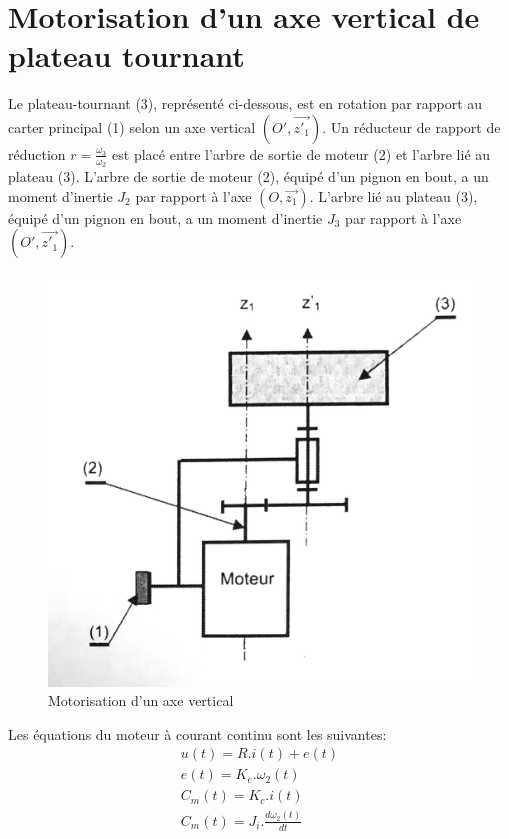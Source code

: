 

\section{Motorisation d'un axe vertical de plateau tournant}

Le plateau-tournant (3), représenté ci-dessous, est en rotation par rapport au carter principal (1) selon un axe vertical $(O',\overrightarrow{z'_1})$. Un réducteur de rapport de réduction $r=\frac{\omega_3}{\omega_2}$ est placé entre l'arbre de sortie de moteur (2) et l'arbre lié au plateau (3). L'arbre de sortie de moteur (2), équipé d'un pignon en bout, a un moment d'inertie $J_2$ par rapport à l'axe $(O,\overrightarrow{z_1})$. L'arbre lié au plateau (3), équipé d'un pignon en bout, a un moment d'inertie $J_3$ par rapport à l'axe $(O',\overrightarrow{z'_1})$.

\begin{figure}[!h]
 \centering\includegraphics[width=0.6\linewidth]{img/fig_moteur_charge_01}
  \caption{Motorisation d'un axe vertical}
 \label{fig_moteur_charge_01}
\end{figure}

Les équations du moteur à courant continu sont les suivantes:
\begin{eqnarray}
u(t)=R.i(t)+e(t) \\
e(t)=K_e.\omega_2(t) \\
C_m(t)=K_c.i(t) \\
C_m(t)=J_i.\frac{d\omega_2(t)}{dt}
\end{eqnarray}

